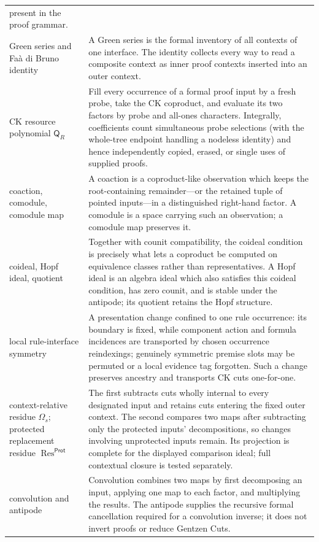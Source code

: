 \documentclass[10pt,a4paper]{article}
\theoremstyle{plain}
\theoremstyle{definition}
\theoremstyle{remark}
\begin{document}
\begin{longtable}{@{}L{4.0cm}L{10.7cm}@{}}
  present in the proof grammar.\\
Green series and Fa\`a di Bruno identity
& A Green series is the formal inventory of all contexts of one interface.
  The identity collects every way to read a composite context as inner
  proof contexts inserted into an outer context.\\
CK resource polynomial \(\mathsf Q_R\)
& Fill every occurrence of a formal proof input by a fresh probe, take the
  CK coproduct, and evaluate its two factors by probe and all-ones
  characters.  Integrally, coefficients count simultaneous probe selections
  (with the whole-tree endpoint handling a nodeless identity) and hence
  independently copied, erased, or single uses of supplied proofs.\\
coaction, comodule, comodule map
& A coaction is a coproduct-like observation which keeps the root-containing
  remainder---or the retained tuple of pointed inputs---in a distinguished
  right-hand factor.  A comodule is a space carrying such an observation; a comodule map
  preserves it.\\
coideal, Hopf ideal, quotient
& Together with counit compatibility, the coideal condition is precisely
  what lets a coproduct be computed on equivalence classes rather than
  representatives.  A Hopf ideal is an algebra ideal which also satisfies
  this coideal condition, has zero counit, and is stable under the antipode;
  its quotient retains the Hopf structure.\\
local rule-interface symmetry
& A presentation change confined to one rule occurrence: its boundary is
  fixed, while component action and formula incidences are transported by
  chosen occurrence reindexings; genuinely
  symmetric premise slots may be permuted or a local evidence tag forgotten.
  Such a change preserves ancestry and transports CK cuts one-for-one.\\
context-relative residue \(\Omega_s\); protected replacement residue
\(\operatorname{Res}^{\mathsf{Prot}}\)
& The first subtracts cuts wholly internal to every designated input and
  retains cuts entering the fixed outer context.  The second compares two
  maps after subtracting only the protected inputs' decompositions, so
  changes involving unprotected inputs remain.  Its projection is complete
  for the displayed comparison ideal; full contextual closure is tested
  separately.\\
convolution and antipode
& Convolution combines two maps by first decomposing an input, applying one
  map to each factor, and multiplying the results.  The antipode supplies
  the recursive formal cancellation required for a convolution inverse; it
  does not invert proofs or reduce Gentzen Cuts.\\
\end{longtable}
\endgroup
\end{document}
